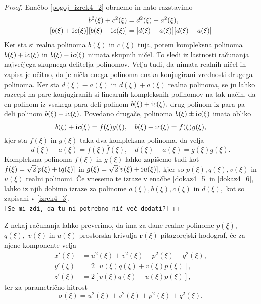 \documentclass[12pt,a4paper,twoside]{article}
\newcommand{\iu}{\mathrm{i}\mkern1mu} %
\theoremstyle{definition} %
\theoremstyle{plain} %
\numberwithin{equation}{section}  %
\newcommand{\rV}{\mathbf{r}}
\begin{document}
\begin{proof}
	Enačbo \eqref{pogoj_izrek4_2} obrnemo in nato razstavimo
	\begin{align}
		b^2(\xi)+c^2(\xi)&=d^2(\xi)-a^2(\xi), \nonumber \\
		[b(\xi)+\iu c(\xi)][b(\xi)-\iu c(\xi)]&=[d(\xi)-a(\xi)][d(\xi)+a(\xi)] \label{dokaz4_4}
	\end{align}
	Ker sta si realna polinoma $b(\xi)$ in $c(\xi)$ tuja, potem kompleksna polinoma $b(\xi)+\iu c(\xi)$ in $b(\xi)-\iu c(\xi)$ nimata skupnih ničel. To sledi iz lastnosti računanja največjega skupnega delitelja polinomov. Velja tudi, da nimata realnih ničel in zapisa je očitno, da je ničla enega polinoma enaka konjugirani vrednosti drugega polinoma. Ker sta $d(\xi)-a(\xi)$ in $d(\xi)+a(\xi)$ realna polinoma, se ju lahko razcepi na pare konjugiranih si linearnih kompleksnih polinomov na tak način, da en polinom iz vsakega para deli polinom $b(\xi)+\iu c(\xi),$ drug polinom iz para pa deli polinom $b(\xi)-\iu c(\xi).$ Povedano drugače, polinoma $b(\xi) \pm \iu c(\xi)$ imata obliko
	\begin{equation}
	\label{dokaz4_5}
		b(\xi)+ \iu c(\xi)=f(\xi)\bar{g}(\xi), \quad b(\xi)-\iu c(\xi)=\bar{f}(\xi)g(\xi),
	\end{equation}
	kjer sta $f(\xi)$ in $g(\xi)$ taka dva kompleksna polinoma, da velja
	\begin{equation}
		\label{dokaz4_6}
		d(\xi)-a(\xi)=f(\xi)\bar{f}(\xi), \quad d(\xi)+a(\xi)=g(\xi)\bar{g}(\xi).
	\end{equation}
	Kompleksna polinoma $f(\xi)$ in $g(\xi)$ lahko zapišemo tudi kot $f(\xi)=\sqrt{2}[p(\xi)+\iu q(\xi)]$ in $g(\xi)=\sqrt{2}[v(\xi)+\iu u(\xi)],$ kjer so $p(\xi),q(\xi),v(\xi)$ in $u(\xi)$ realni polinomi. Če vnesemo te izraze v enačbe \eqref{dokaz4_5} in \eqref{dokaz4_6}, lahko iz njih dobimo izraze za polinome $a(\xi),b(\xi),c(\xi)$ in $d(\xi),$ kot so zapisani v \eqref{izrek4_3}.\\
\texttt{[Se mi zdi, da tu ni potrebno nič več dodati?]}
\end{proof}

Z nekaj računanja lahko preverimo, da ima za dane realne polinome $p(\xi),$ $q(\xi),$ $v(\xi)$ in $u(\xi)$ prostorska krivulja $\rV(\xi)$ pitagorejski hodograf, če za njene komponente velja
\begin{align}
	x'(\xi)&=u^2(\xi)+v^2(\xi)-p^2(\xi)-q^2(\xi), \nonumber \\
	y'(\xi)&=2[u(\xi)q(\xi)+v(\xi)p(\xi)], \nonumber \\
	z'(\xi)&=2[v(\xi)q(\xi)-u(\xi)p(\xi)], \label{eq4_7}
\end{align}
ter za parametrično hitrost
\begin{equation}
	\label{eq4_8}
	\sigma(\xi)=u^2(\xi)+v^2(\xi)+p^2(\xi)+q^2(\xi).
\end{equation}
\end{document}

